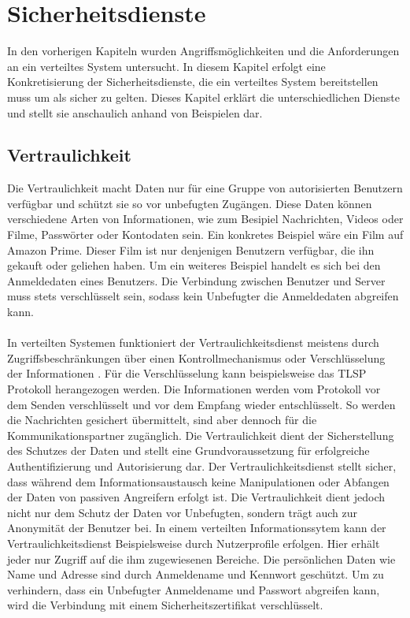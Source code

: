 \documentclass[utf8,biblatex]{lni}
\begin{document}
\section{Sicherheitsdienste}\label{Sicherheitsdienste}

In den vorherigen Kapiteln wurden Angriffsmöglichkeiten und die Anforderungen an ein verteiltes System untersucht. In diesem Kapitel erfolgt eine Konkretisierung der Sicherheitsdienste, die
ein verteiltes System bereitstellen muss um als sicher zu gelten. Dieses Kapitel erklärt die unterschiedlichen Dienste und stellt sie anschaulich anhand von Beispielen dar.

\subsection{Vertraulichkeit}
Die Vertraulichkeit macht Daten nur für eine Gruppe von autorisierten Benutzern verfügbar und schützt sie so vor unbefugten Zugängen. Diese Daten können verschiedene Arten von Informationen,
wie zum Besipiel Nachrichten, Videos oder Filme, Passwörter oder Kontodaten sein. Ein konkretes Beispiel wäre ein Film auf Amazon Prime. Dieser Film ist nur denjenigen
Benutzern verfügbar, die ihn gekauft oder geliehen haben. Um ein weiteres Beispiel handelt es sich bei den Anmeldedaten eines Benutzers. Die Verbindung zwischen Benutzer
und Server muss stets verschlüsselt sein, sodass kein Unbefugter die Anmeldedaten abgreifen kann. \cite{Kriha.2008}
\\\\
In verteilten Systemen funktioniert der Vertraulichkeitsdienst meistens durch Zugriffsbeschränkungen über einen Kontrollmechanismus oder Verschlüsselung der Informationen \cite{Mirhakkak.1993}.
Für die Verschlüsselung kann beispielsweise das TLSP Protokoll herangezogen werden. Die Informationen werden vom Protokoll vor dem Senden verschlüsselt und vor dem Empfang wieder entschlüsselt.
So werden die Nachrichten gesichert übermittelt, sind aber dennoch für die Kommunikationspartner zugänglich. Die Vertraulichkeit dient der Sicherstellung des Schutzes der Daten und stellt eine Grundvoraussetzung für erfolgreiche Authentifizierung
und Autorisierung dar. Der Vertraulichkeitsdienst stellt sicher, dass während dem Informationsaustausch keine Manipulationen oder Abfangen der Daten von passiven Angreifern erfolgt ist. \cite{Mirhakkak.1993}
Die Vertraulichkeit dient jedoch nicht nur dem Schutz der Daten vor Unbefugten, sondern trägt auch zur Anonymität der Benutzer bei.
In einem verteilten Informationssytem kann der Vertraulichkeitsdienst Beispielsweise durch Nutzerprofile erfolgen. Hier erhält jeder nur Zugriff auf die ihm zugewiesenen Bereiche. Die persönlichen Daten wie Name und
Adresse sind durch Anmeldename und Kennwort geschützt. Um zu verhindern, dass ein Unbefugter Anmeldename und Passwort abgreifen kann, wird die Verbindung mit einem Sicherheitszertifikat verschlüsselt.
\end{document}
